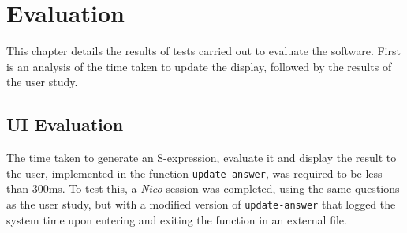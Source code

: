 \documentclass[12pt,twoside,notitlepage,xetex]{report}
\begin{document}
\cleardoublepage
\chapter{Evaluation}

This chapter details the results of tests carried out to evaluate the software.  First is an analysis of the time taken to update the display, followed by the results of the user study.

%
%
\section{UI Evaluation}

The time taken to generate an S-expression, evaluate it and display the result to the user, implemented in the function \verb¬update-answer¬, was required to be less than 300ms.  To test this, a \emph{Nico} session was completed, using the same questions as the user study, but with a modified version of \verb¬update-answer¬ that logged the system time upon entering and exiting the function in an external file.
\end{document}
